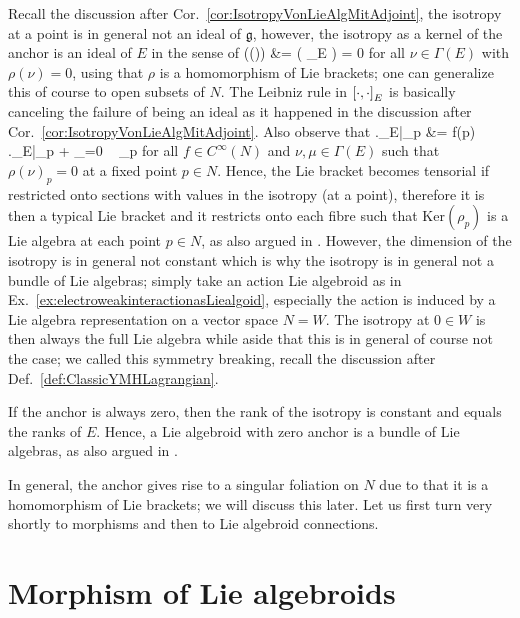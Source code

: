 Recall the discussion after Cor.~\ref{cor:IsotropyVonLieAlgMitAdjoint}, the isotropy at a point is in general not an ideal of $\mathfrak{g}$, however, the isotropy as a kernel of the anchor is an ideal of $E$ in the sense of
\bas
\rho\bigl((\nu)\bigr)
&=
\rho\mleft(
	\mleft[ \nu, \cdot \mright]_E
\mright)
=
0
\eas
for all $\nu \in \Gamma(E)$ with $\rho(\nu) = 0$, using that $\rho$ is a homomorphism of Lie brackets; one can generalize this of course to open subsets of $N$. The Leibniz rule in $\mleft[ \cdot, \cdot \mright]_E$ is basically canceling the failure of being an ideal as it happened in the discussion after Cor.~\ref{cor:IsotropyVonLieAlgMitAdjoint}. Also observe that
\bas
\mleft.\mleft[ \nu, f\mu \mright]_E\mright|_p
&=
f(p) ~ \mleft.\mleft[ \nu, \mu \mright]_E\mright|_p
	+ _{=0} ~ \mu_p
\eas
for all $f \in C^\infty(N)$ and $\nu, \mu \in \Gamma(E)$ such that $\rho(\nu)_p = 0$ at a fixed point $p \in N$. Hence, the Lie bracket becomes tensorial if restricted onto sections with values in the isotropy (at a point), therefore it is then a typical Lie bracket and it restricts onto each fibre such that $\mathrm{Ker}(\rho_p)$ is a Lie algebra at each point $p \in N$, as also argued in \cite[\S 16.1, comment after the remark on page 113]{DaSilva}. However, the dimension of the isotropy is in general not constant which is why the isotropy is in general not a bundle of Lie algebras; simply take an action Lie algebroid as in Ex.~\ref{ex:electroweakinteractionasLiealgoid}, especially the action is induced by a Lie algebra representation on a vector space $N = W$. The isotropy at $0 \in W$ is then always the full Lie algebra while aside that this is in general of course not the case; we called this symmetry breaking, recall the discussion after Def.~\ref{def:ClassicYMHLagrangian}. 

If the anchor is always zero, then the rank of the isotropy is constant and equals the ranks of $E$. Hence, a Lie algebroid with zero anchor is a bundle of Lie algebras, as also argued in \cite[second example in \S 16.2; page 114]{DaSilva}.

In general, the anchor gives rise to a singular foliation on $N$ due to that it is a homomorphism of Lie brackets; we will discuss this later. Let us first turn very shortly to morphisms and then to Lie algebroid connections.

\section{Morphism of Lie algebroids}\label{MorphsOfLieOids}

